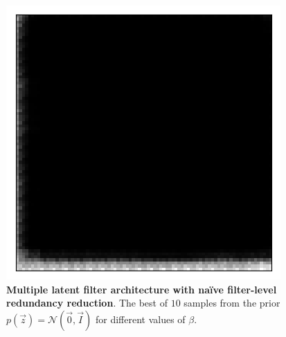 \begin{figure}[h!]
\begin{multicols}{3}
    \includegraphics[scale=0.4]{figures/results/naive_average/beta_32_prior_sample_3.png}
    \caption{$\beta=32$}
\end{multicols}
\caption{\textbf{Multiple latent filter architecture with na{\"i}ve filter-level redundancy reduction}. The best of $10$ samples from the prior $p(\vec{z}) = \mathcal{N}(\vec{0}, \vec{I})$ for different values of $\beta$.}
\label{fig:naive_average_decoupling_prior_samples}
\end{figure}


